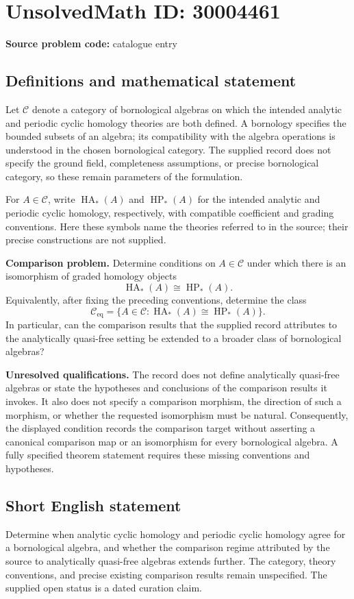 \documentclass[11pt]{article}
\begin{document}
\section*{UnsolvedMath ID: 30004461}
\textbf{Source problem code:} catalogue entry
\subsection{Definitions and mathematical statement}
Let \(\mathcal C\) denote a category of bornological algebras on which the intended analytic and periodic cyclic homology theories are both defined. A bornology specifies the bounded subsets of an algebra; its compatibility with the algebra operations is understood in the chosen bornological category. The supplied record does not specify the ground field, completeness assumptions, or precise bornological category, so these remain parameters of the formulation.

For \(A\in\mathcal C\), write \(\operatorname{HA}_*(A)\) and \(\operatorname{HP}_*(A)\) for the intended analytic and periodic cyclic homology, respectively, with compatible coefficient and grading conventions. Here these symbols name the theories referred to in the source; their precise constructions are not supplied.

\textbf{Comparison problem.} Determine conditions on \(A\in\mathcal C\) under which there is an isomorphism of graded homology objects
\[
\operatorname{HA}_*(A)\cong\operatorname{HP}_*(A).
\]
Equivalently, after fixing the preceding conventions, determine the class
\[
\mathcal C_{\mathrm{eq}}
=
\bigl\{A\in\mathcal C:\operatorname{HA}_*(A)\cong\operatorname{HP}_*(A)\bigr\}.
\]
In particular, can the comparison results that the supplied record attributes to the analytically quasi-free setting be extended to a broader class of bornological algebras?

\textbf{Unresolved qualifications.} The record does not define analytically quasi-free algebras or state the hypotheses and conclusions of the comparison results it invokes. It also does not specify a comparison morphism, the direction of such a morphism, or whether the requested isomorphism must be natural. Consequently, the displayed condition records the comparison target without asserting a canonical comparison map or an isomorphism for every bornological algebra. A fully specified theorem statement requires these missing conventions and hypotheses.
\subsection{Short English statement}
Determine when analytic cyclic homology and periodic cyclic homology agree for a bornological algebra, and whether the comparison regime attributed by the source to analytically quasi-free algebras extends further. The category, theory conventions, and precise existing comparison results remain unspecified. The supplied open status is a dated curation claim.
\end{document}
